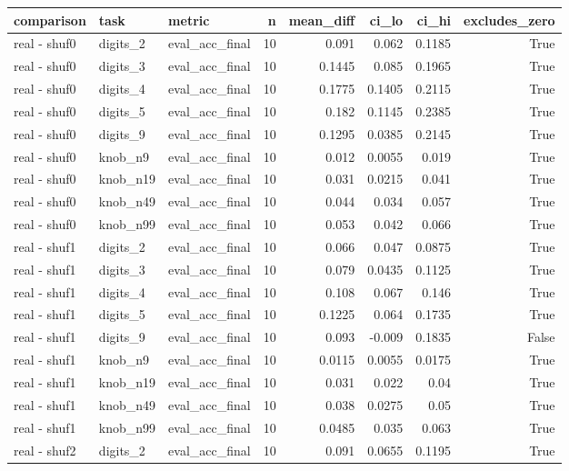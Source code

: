 \begin{table}[t]
\centering
\small
\begin{tabular}{lllrrrrr}
\toprule
comparison & task & metric & n & mean\_diff & ci\_lo & ci\_hi & excludes\_zero \\
\midrule
real - shuf0 & digits\_2 & eval\_acc\_final & 10 & 0.091 & 0.062 & 0.1185 & True \\
real - shuf0 & digits\_3 & eval\_acc\_final & 10 & 0.1445 & 0.085 & 0.1965 & True \\
real - shuf0 & digits\_4 & eval\_acc\_final & 10 & 0.1775 & 0.1405 & 0.2115 & True \\
real - shuf0 & digits\_5 & eval\_acc\_final & 10 & 0.182 & 0.1145 & 0.2385 & True \\
real - shuf0 & digits\_9 & eval\_acc\_final & 10 & 0.1295 & 0.0385 & 0.2145 & True \\
real - shuf0 & knob\_n9 & eval\_acc\_final & 10 & 0.012 & 0.0055 & 0.019 & True \\
real - shuf0 & knob\_n19 & eval\_acc\_final & 10 & 0.031 & 0.0215 & 0.041 & True \\
real - shuf0 & knob\_n49 & eval\_acc\_final & 10 & 0.044 & 0.034 & 0.057 & True \\
real - shuf0 & knob\_n99 & eval\_acc\_final & 10 & 0.053 & 0.042 & 0.066 & True \\
real - shuf1 & digits\_2 & eval\_acc\_final & 10 & 0.066 & 0.047 & 0.0875 & True \\
real - shuf1 & digits\_3 & eval\_acc\_final & 10 & 0.079 & 0.0435 & 0.1125 & True \\
real - shuf1 & digits\_4 & eval\_acc\_final & 10 & 0.108 & 0.067 & 0.146 & True \\
real - shuf1 & digits\_5 & eval\_acc\_final & 10 & 0.1225 & 0.064 & 0.1735 & True \\
real - shuf1 & digits\_9 & eval\_acc\_final & 10 & 0.093 & -0.009 & 0.1835 & False \\
real - shuf1 & knob\_n9 & eval\_acc\_final & 10 & 0.0115 & 0.0055 & 0.0175 & True \\
real - shuf1 & knob\_n19 & eval\_acc\_final & 10 & 0.031 & 0.022 & 0.04 & True \\
real - shuf1 & knob\_n49 & eval\_acc\_final & 10 & 0.038 & 0.0275 & 0.05 & True \\
real - shuf1 & knob\_n99 & eval\_acc\_final & 10 & 0.0485 & 0.035 & 0.063 & True \\
real - shuf2 & digits\_2 & eval\_acc\_final & 10 & 0.091 & 0.0655 & 0.1195 & True \\

\end{tabular}
\end{table}
